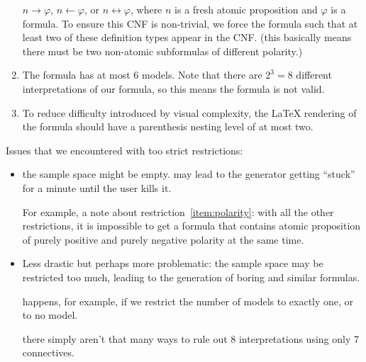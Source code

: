 \begin{enumerate}
        $n \rightarrow \varphi$,
        $n \leftarrow \varphi$, or
        $n \leftrightarrow \varphi$,
        where $n$ is a fresh atomic proposition and $\varphi$ is a formula.
        To ensure this CNF is non-trivial,
        we force the formula such that at least two of these definition types appear in the CNF.
        (this basically means there must be two non-atomic subformulas of different polarity.)
    \item
        The formula has at most $6$ models.
        Note that there are $2^3 = 8$ different interpretations of our formula,
        so this means the formula is not valid.
    \item
        To reduce difficulty introduced by visual complexity,
        the \LaTeX{} rendering of the formula should have a parenthesis nesting level of at most two.
\end{enumerate}

Issues that we encountered with too strict restrictions:
\begin{itemize}
    \item
        the sample space might be empty.
        may lead to the generator getting ``stuck'' for a minute until the user kills it.

        For example, a note about restriction~\ref{item:polarity}:
        with all the other restrictions,
        it is impossible to get a formula that contains atomic proposition
        of purely positive and purely negative polarity at the same time.

    \item
        Less drastic but perhaps more problematic:
        the sample space may be restricted too much,
        leading to the generation of boring and similar formulas.

        happens, for example, if we restrict the number of models to exactly one,
        or to no model.

        there simply aren't that many ways to rule out 8 interpretations
        using only 7 connectives.
\end{itemize}




